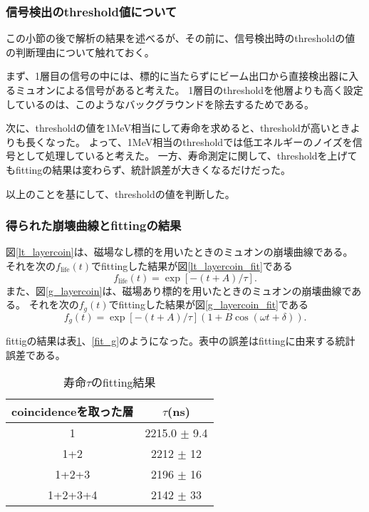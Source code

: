 \subsubsection{信号検出のthreshold値について}
この小節の後で解析の結果を述べるが、その前に、信号検出時のthresholdの値の判断理由について触れておく。

まず、1層目の信号の中には、標的に当たらずにビーム出口から直接検出器に入るミュオンによる信号があると考えた。
1層目のthresholdを他層よりも高く設定しているのは、このようなバックグラウンドを除去するためである。

次に、thresholdの値を1MeV相当にして寿命を求めると、thresholdが高いときよりも長くなった。
よって、1MeV相当のthresholdでは低エネルギーのノイズを信号として処理していると考えた。
一方、寿命測定に関して、thresholdを上げてもfittingの結果は変わらず、統計誤差が大きくなるだけだった。

以上のことを基にして、thresholdの値を判断した。

\subsubsection{得られた崩壊曲線とfittingの結果}
図\ref{lt_layercoin}は、磁場なし標的を用いたときのミュオンの崩壊曲線である。
それを次の$f_{\mathrm{life}}(t)$でfittingした結果が図\ref{lt_layercoin_fit}である
\begin{equation*}
f_{\mathrm{life}}(t) = \exp[-(t+A)/\tau].
\end{equation*}
また、図\ref{g_layercoin}は、磁場あり標的を用いたときのミュオンの崩壊曲線である。
それを次の$f_{g}(t)$でfittingした結果が図\ref{g_layercoin_fit}である
\begin{equation*}
f_{g}(t) = \exp[-(t+A)/\tau](1+B\cos(\omega t + \delta)).
\end{equation*}

fittigの結果は表\ref{fit_lt}、\ref{fit_g}のようになった。表中の誤差はfittingに由来する統計誤差である。

\begin{table}[H]
\caption{寿命$\tau$のfitting結果}
\label{fit_lt}
\begin{center}
\begin{tabular}{cc}\toprule
coincidenceを取った層 	& $\tau$(ns) \\ \midrule
1 			& 2215.0 $\pm$ 9.4 \\
1+2 			& 2212 $\pm$ 12 \\
1+2+3 			& 2196 $\pm$ 16 \\
1+2+3+4 		& 2142 $\pm$ 33 \\ \bottomrule
\end{tabular}
\end{center}
\end{table}%

